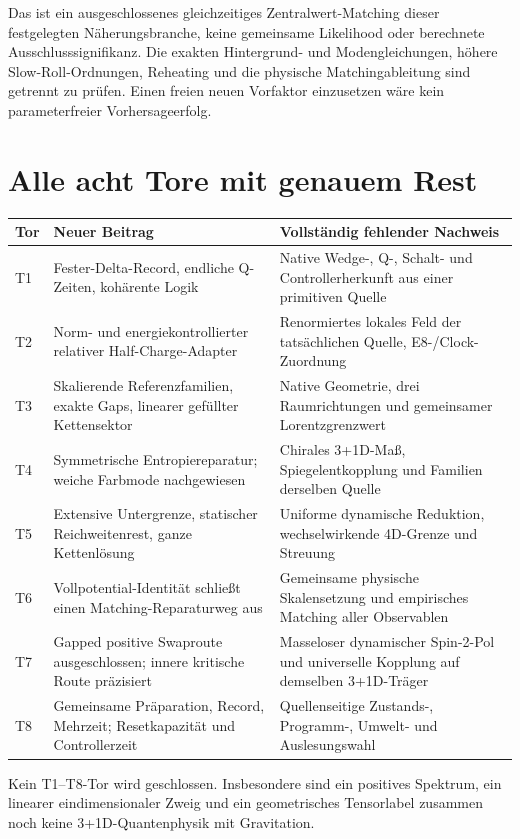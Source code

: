 Das ist ein ausgeschlossenes gleichzeitiges Zentralwert-Matching dieser festgelegten Näherungsbranche, keine gemeinsame Likelihood oder berechnete Ausschlusssignifikanz. Die exakten Hintergrund- und Modengleichungen, höhere Slow-Roll-Ordnungen, Reheating und die physische Matchingableitung sind getrennt zu prüfen. Einen freien neuen Vorfaktor einzusetzen wäre kein parameterfreier Vorhersageerfolg.

\section{Alle acht Tore mit genauem Rest}
\small
\begin{longtable}{L{13mm}L{57mm}L{67mm}}
\toprule Tor&Neuer Beitrag&Vollständig fehlender Nachweis\\\midrule
\endhead
T1&Fester-Delta-Record, endliche Q-Zeiten, kohärente Logik&Native Wedge-, Q-, Schalt- und Controllerherkunft aus einer primitiven Quelle\\
T2&Norm- und energiekontrollierter relativer Half-Charge-Adapter&Renormiertes lokales Feld der tatsächlichen Quelle, E8-/Clock-Zuordnung\\
T3&Skalierende Referenzfamilien, exakte Gaps, linearer gefüllter Kettensektor&Native Geometrie, drei Raumrichtungen und gemeinsamer Lorentzgrenzwert\\
T4&Symmetrische Entropiereparatur; weiche Farbmode nachgewiesen&Chirales 3+1D-Maß, Spiegelentkopplung und Familien derselben Quelle\\
T5&Extensive Untergrenze, statischer Reichweitenrest, ganze Kettenlösung&Uniforme dynamische Reduktion, wechselwirkende 4D-Grenze und Streuung\\
T6&Vollpotential-Identität schließt einen Matching-Reparaturweg aus&Gemeinsame physische Skalensetzung und empirisches Matching aller Observablen\\
T7&Gapped positive Swaproute ausgeschlossen; innere kritische Route präzisiert&Masseloser dynamischer Spin-2-Pol und universelle Kopplung auf demselben 3+1D-Träger\\
T8&Gemeinsame Präparation, Record, Mehrzeit; Resetkapazität und Controllerzeit&Quellenseitige Zustands-, Programm-, Umwelt- und Auslesungswahl\\\bottomrule
\end{longtable}
\normalsize

Kein T1--T8-Tor wird geschlossen. Insbesondere sind ein positives Spektrum, ein linearer eindimensionaler Zweig und ein geometrisches Tensorlabel zusammen noch keine 3+1D-Quantenphysik mit Gravitation.

